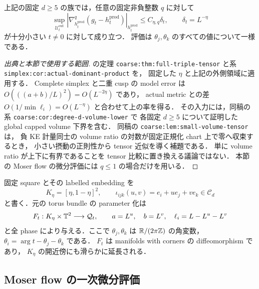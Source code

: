 \begin{proposition}
\label{ke:open-cell-analytic-input}
上記の固定 $d\ge5$ の族では，任意の固定非負整数 $q$ に対して
\begin{equation}\label{ke:eq:open-tensor-input}
 \sup_{\mathcal U_t^{\mathrm{out}}}
 \left|\nabla_{h_t^{\mathrm{prod}}}^{q}
       (g_t-h_t^{\mathrm{prod}})\right|_{h_t^{\mathrm{prod}}}
 \le C_{\eta,q}\delta_t,
 \qquad \delta_t=L^{-\eta}
\end{equation}
が十分小さい $t\ne0$ に対して成り立つ．
評価は $\theta_j,\theta_k$ のすべての値について一様である．
\end{proposition}
\begin{proof}[出典と本節で使用する範囲]
\cite[Part~IV]{KELocalCurrent}の定理
\texttt{coarse:thm:full-triple-tensor} と系
\texttt{simplex:cor:actual-dominant-product} を，
固定した $\eta$ と上記の外側領域に適用する．
Complete simplex と二重 cusp の model error は
$O(((a+b)/L)^2)=O(L^{-2\eta})$ であり，
actual metric との差 $O(1/\min\ell_i)=O(L^{-\eta})$ と合わせて上の率を得る．
その入力には，同稿の系 \texttt{coarse:cor:degree-d-volume-lower} で
各固定 $d\ge5$ について証明した global capped volume 下界を含む．
同稿の \texttt{coarse:lem:small-volume-tensor} は，
負 KE 計量同士の volume ratio の対数が固定正規化 chart 上で零へ収束するとき，
小さい摂動の正則性から tensor 近似を導く補題である．
単に volume ratio が上下に有界であることを tensor 比較に置き換える議論ではない．
本節の Moser flow の微分評価には $q\le1$ の場合だけを用いる．
\end{proof}

固定 square とその labelled embedding を
\[
 K_\eta=[\eta,1-\eta]^2,\qquad
 \iota_{ijk}(u,v)=e_i+u e_j+v e_k\in\mathcal C_d
\]
と書く．元の torus bundle の parameter 化は
\begin{equation}\label{ke:eq:open-square-parameter}
 F_t:K_\eta\times\mathbb T^2\longrightarrow\mathcal Q_t,
 \qquad a=L^u,\quad b=L^v,
 \quad\ell_i=L-L^u-L^v
\end{equation}
と全 phase により与える．ここで $\theta_j,\theta_k$ は
$\mathbb R/(2\pi\mathbb Z)$ の角変数，$\theta_i=\arg t-\theta_j-\theta_k$ である．
$F_t$ は manifolds with corners の diffeomorphism であり，
$K_\eta$ の開近傍にも滑らかに延長される．

\subsection{Moser flow の一次微分評価}

